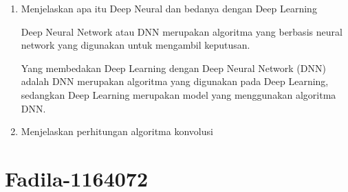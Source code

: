 \begin{enumerate}
\item Menjelaskan apa itu Deep Neural dan bedanya dengan Deep Learning
	\par Deep Neural Network atau DNN merupakan algoritma yang berbasis neural network yang digunakan untuk mengambil keputusan.
	\par Yang membedakan Deep Learning dengan  Deep Neural Network (DNN) adalah DNN merupakan algoritma yang digunakan pada Deep Learning, sedangkan Deep Learning merupakan model yang menggunakan algoritma DNN.

\item Menjelaskan perhitungan algoritma konvolusi
\end{enumerate}



\par
\par
\par
\par
\section{Fadila-1164072}

